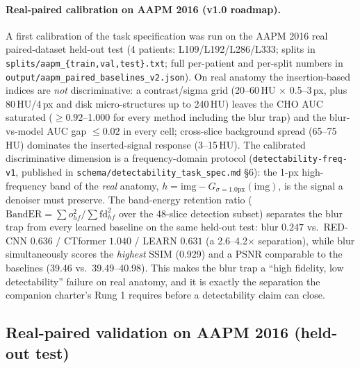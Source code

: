 \documentclass[twoside,11pt]{article}
\begin{document}
\paragraph{Real-paired calibration on AAPM 2016 (v1.0 roadmap).} A first calibration of the task specification was run on the AAPM 2016 real paired-dataset held-out test (4 patients: L109/L192/L286/L333; splits in \texttt{splits/aapm\_\{train,val,test\}.txt}; full per-patient and per-split numbers in \texttt{output/aapm\_paired\_baselines\_v2.json}). On real anatomy the insertion-based indices are \emph{not} discriminative: a contrast/sigma grid (20--60\,HU $\times$ 0.5--3\,px, plus 80\,HU/4\,px and disk micro-structures up to 240\,HU) leaves the CHO AUC saturated ($\ge 0.92$--1.000 for every method including the blur trap) and the blur-vs-model AUC gap $\le 0.02$ in every cell; cross-slice background spread (65--75\,HU) dominates the inserted-signal response (3--15\,HU). The calibrated discriminative dimension is a frequency-domain protocol (\texttt{detectability-freq-v1}, published in \texttt{schema/detectability\_task\_spec.md} \S6): the 1-px high-frequency band of the \emph{real} anatomy, $h = \mathrm{img} - G_{\sigma=1.0\mathrm{px}}(\mathrm{img})$, is the signal a denoiser must preserve. The band-energy retention ratio ($\mathrm{BandER} = \sum o_{hf}^2 / \sum \mathrm{fd}_{hf}^2$ over the 48-slice detection subset) separates the blur trap from every learned baseline on the same held-out test: blur $0.247$ vs.\ RED-CNN $0.636$ / CTformer $1.040$ / LEARN $0.631$ (a 2.6--4.2$\times$ separation), while blur simultaneously scores the \emph{highest} SSIM (0.929) and a PSNR comparable to the baselines (39.46 vs.\ 39.49--40.98). This makes the blur trap a ``high fidelity, low detectability'' failure on real anatomy, and it is exactly the separation the companion charter's Rung 1 requires before a detectability claim can close.

\subsection*{Real-paired validation on AAPM 2016 (held-out test)}
\end{document}
